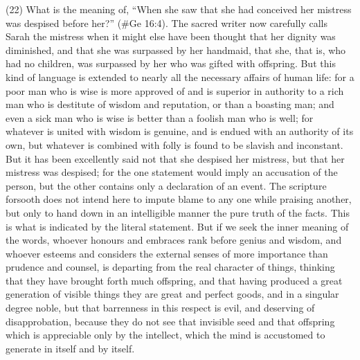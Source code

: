 (22) What is the meaning of, ``When she saw that she had conceived her mistress was despised
before her?'' (\#Ge 16:4). The sacred writer now carefully calls Sarah the mistress when it
might else have been thought that her dignity was diminished, and that she was surpassed by her
handmaid, that she, that is, who had no children, was surpassed by her who was gifted with
offspring. But this kind of language is extended to nearly all the necessary affairs of human life: for
a poor man who is wise is more approved of and is superior in authority to a rich man who is
destitute of wisdom and reputation, or than a boasting man; and even a sick man who is wise is
better than a foolish man who is well; for whatever is united with wisdom is genuine, and is endued
with an authority of its own, but whatever is combined with folly is found to be slavish and
inconstant. But it has been excellently said not that she despised her mistress, but that her
mistress was despised; for the one statement would imply an accusation of the person, but the
other contains only a declaration of an event. The scripture forsooth does not intend here to
impute blame to any one while praising another, but only to hand down in an intelligible manner the
pure truth of the facts. This is what is indicated by the literal statement. But if we seek the inner
meaning of the words, whoever honours and embraces rank before genius and wisdom, and
whoever esteems and considers the external senses of more importance than prudence and
counsel, is departing from the real character of things, thinking that they have brought forth much
offspring, and that having produced a great generation of visible things they are great and perfect
goods, and in a singular degree noble, but that barrenness in this respect is evil, and deserving of
disapprobation, because they do not see that invisible seed and that offspring which is appreciable
only by the intellect, which the mind is accustomed to generate in itself and by itself.

